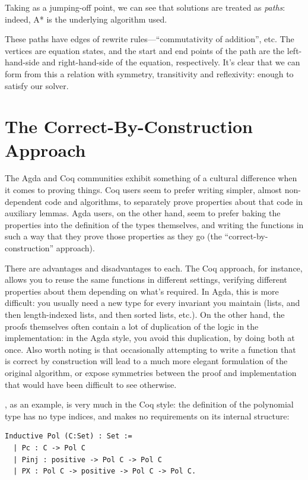 \documentclass[draft, twocolumn]{article}
\theoremstyle{definition}
\theoremstyle{definition}
\begin{document}
Taking\cite{lioubartsev_constructing_2016} as a jumping-off point, we can see
that solutions are treated as \emph{paths}: indeed, A* is the underlying
algorithm used.

These paths have edges of rewrite rules---``commutativity of addition'', etc.
The vertices are equation states, and the start and end points of the path are
the left-hand-side and right-hand-side of the equation, respectively. It's clear
that we can form from this a relation with symmetry, transitivity and
reflexivity: enough to satisfy our solver.

\section{The Correct-By-Construction Approach}
The Agda and Coq communities exhibit something of a cultural difference when it
comes to proving things. Coq users seem to prefer writing simpler, almost
non-dependent code and algorithms, to separately prove properties about that
code in auxiliary lemmas. Agda users, on the other hand, seem to prefer baking
the properties into the definition of the types themselves, and writing the
functions in such a way that they prove those properties as they go (the
``correct-by-construction'' approach).

There are advantages and disadvantages to each. The Coq approach, for instance,
allows you to reuse the same functions in different settings, verifying
different properties about them depending on what's required. In Agda, this is
more difficult: you usually need a new type for every invariant you maintain
(lists, and then length-indexed lists, and then sorted lists, etc.). On the
other hand, the proofs themselves often contain a lot of duplication of the
logic in the implementation: in the Agda style, you avoid this duplication, by
doing both at once. Also worth noting is that occasionally attempting to write a
function that is correct by construction will lead to a much more elegant
formulation of the original algorithm, or expose symmetries between the proof
and implementation that would have been difficult to see otherwise.

\cite{gregoire_proving_2005}, as an example, is very much in the Coq style: the
definition of the polynomial type has no type indices, and makes no requirements
on its internal structure:
\begin{small}
\begin{verbatim}
Inductive Pol (C:Set) : Set :=
  | Pc : C -> Pol C
  | Pinj : positive -> Pol C -> Pol C
  | PX : Pol C -> positive -> Pol C -> Pol C.
\end{verbatim}
\end{small}
\end{document}
